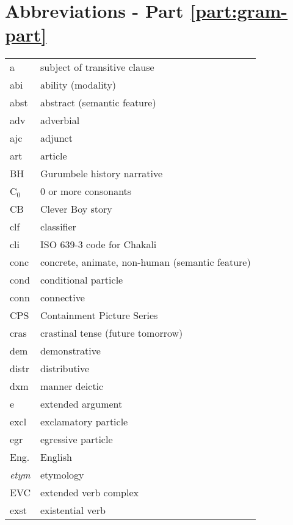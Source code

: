 
\chapter*{Abbreviations - Part \ref{part:gram-part}}
\label{sec-ABB}



 \begin{tabular}{ll}


{\sc a} & subject of transitive clause\\
{\sc abi} & ability (modality)\\
 {\sc abst} & abstract (semantic feature)\\
 {\sc adv} & adverbial  \\
  {\sc ajc} & adjunct  \\
{\sc art} &  article\\

BH & Gurumbele history narrative\\

C$_0$ & 0 or more consonants\\

CB  & Clever Boy story\\
{\sc clf} & classifier\\
cli & ISO 639-3 code for Chakali\\
 {\sc conc} & concrete, animate, non-human (semantic feature)\\
 {\sc cond} & conditional particle\\
 {\sc conn} &  connective\\
CPS & Containment Picture Series\\
 {\sc cras} & crastinal tense (future tomorrow) \\

 {\sc dem} & demonstrative \\
 {\sc distr} & distributive \\
{\sc dxm} & manner deictic\\
{\sc e} & extended argument\\
{\sc excl} & exclamatory particle\\
{\sc egr} & egressive particle\\
Eng. & English\\
{\it etym} & etymology\\
EVC & extended verb complex\\
{\sc exst} & existential verb\\



\end{tabular}
